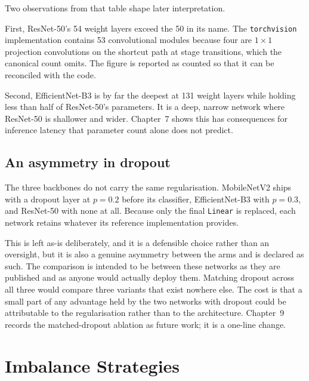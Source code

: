 Two observations from that table shape later interpretation.

First, ResNet-50's 54 weight layers exceed the 50 in its name. The
\texttt{torchvision} implementation contains 53 convolutional modules because four are
$1\times1$ projection convolutions on the shortcut path at stage transitions, which the
canonical count omits. The figure is reported as counted so that it can be reconciled
with the code.

Second, EfficientNet-B3 is by far the deepest at 131 weight layers while holding less
than half of ResNet-50's parameters. It is a deep, narrow network where ResNet-50 is
shallower and wider. Chapter~7 shows this has consequences for inference latency that
parameter count alone does not predict.

\subsection{An asymmetry in dropout}
\label{sec:method-dropout}

The three backbones do not carry the same regularisation. MobileNetV2 ships with a
dropout layer at $p = 0.2$ before its classifier, EfficientNet-B3 with $p = 0.3$, and
ResNet-50 with none at all. Because only the final \texttt{Linear} is replaced, each
network retains whatever its reference implementation provides.

This is left as-is deliberately, and it is a defensible choice rather than an oversight,
but it is also a genuine asymmetry between the arms and is declared as such. The
comparison is intended to be between these networks as they are published and as anyone
would actually deploy them. Matching dropout across all three would compare three
variants that exist nowhere else. The cost is that a small part of any advantage held by
the two networks with dropout could be attributable to the regularisation rather than to
the architecture. Chapter~9 records the matched-dropout ablation as future work; it is a
one-line change.

\section{Imbalance Strategies}
\label{sec:method-strategies}

